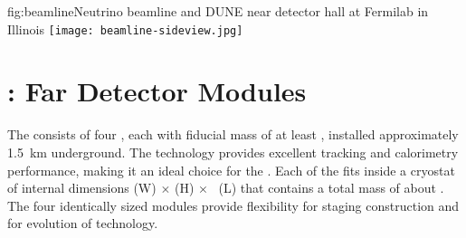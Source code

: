 \begin{dunefigure}{fig:beamline}{Neutrino beamline and DUNE near detector hall at Fermilab in Illinois}
\texttt{[image: beamline-sideview.jpg]}
\end{dunefigure}

\section{: Far Detector Modules}
\label{sec:physics-intro-dunefd}

The \fdfiducialmass {}  consists of four  , each with fiducial mass of at least \nominalmodsize, installed approximately \SI{1.5}{km} underground. The  technology provides
excellent tracking and calorimetry performance, making it an ideal
choice for the  . Each of the  fits inside a cryostat of internal dimensions
\cryostatwdth (W) $\times$ \cryostatht (H) $\times$ \cryostatlen~(L) that contains a total  mass of about \larmass{}.
 The four identically sized modules provide flexibility for staging construction and for evolution of  technology.


